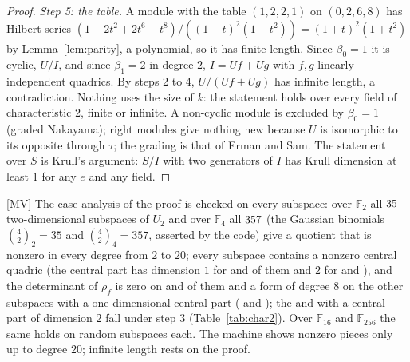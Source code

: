\documentclass[11pt]{article}
\theoremstyle{definition}
\theoremstyle{remark}
\newcommand{\F}{\mathbb{F}}
\begin{document}
\begin{proof}
\emph{Step 5: the table.} A module with the table $(1,2,2,1)$ on $(0,2,6,8)$ has Hilbert series $(1-2t^2+2t^6-t^8)/((1-t)^2(1-t^2))=(1+t)^2(1+t^2)$ by Lemma~\ref{lem:parity}, a polynomial, so it has finite length. Since $\beta_0=1$ it is cyclic, $U/I$, and since $\beta_1=2$ in degree $2$, $I=Uf+Ug$ with $f,g$ linearly independent quadrics. By steps 2 to 4, $U/(Uf+Ug)$ has infinite length, a contradiction. Nothing uses the size of $k$: the statement holds over every field of characteristic $2$, finite or infinite. A non-cyclic module is excluded by $\beta_0=1$ (graded Nakayama); right modules give nothing new because $U$ is isomorphic to its opposite through $\tau$; the grading is that of Erman and Sam. The statement over $S$ is Krull's argument: $S/I$ with two generators of $I$ has Krull dimension at least $1$ for any $e$ and any field. \qedhere
\end{proof}

[MV] The case analysis of the proof is checked on every subspace: over $\F_2$ all $35$ two-dimensional subspaces of $U_2$ and over $\F_4$ all $357$ (the Gaussian binomials $\binom42_2=35$ and $\binom42_4=357$, asserted by the code) give a quotient that is nonzero in every degree from $2$ to $20$; every subspace contains a nonzero central quadric (the central part has dimension $1$ for \ncentralOneTwo{} and \ncentralOneFour{} of them and $2$ for \ncentralTwoTwo{} and \ncentralTwoFour{}), and the determinant of $\rho_f$ is zero on \ndetZeroTwo{} and \ndetZeroFour{} of them and a form of degree $8$ on the other subspaces with a one-dimensional central part (\ndetNonzeroTwo{} and \ndetNonzeroFour{}); the \ncentralTwoTwo{} and \ncentralTwoFour{} with a central part of dimension $2$ fall under step 3 (Table~\ref{tab:char2}). Over $\F_{16}$ and $\F_{256}$ the same holds on \nsubGFsixteen{} random subspaces each. The machine shows nonzero pieces only up to degree $20$; infinite length rests on the proof.

\begin{table}[htbp]
\centering\footnotesize

\caption{Two-dimensional subspaces of $U_2=\langle x^2,xy,y^2,z\rangle$ in characteristic $2$: all subspaces over $\F_2$ and $\F_4$ and $200$ random subspaces over $\F_{16}$ and $\F_{256}$; the dimension $c$ of the central part (0, 1 or 2), the number of subspaces with $\det\rho_f=0$, the degree of $\det\rho_f$ otherwise, and how many Hilbert functions are eventually constant equal to $2$ against growing; every quotient is nonzero in each degree from $2$ to $20$.}
\label{tab:char2}
\end{table}
\end{document}
